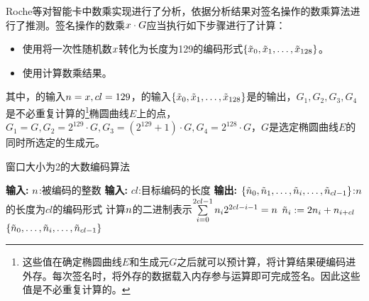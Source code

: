 {	Roche等\citep{Roche21}对智能卡中数乘实现进行了分析，依据分析结果对签名操作的数乘算法进行了推测。签名操作的数乘$x\cdot G$应当执行如下步骤进行了计算：
	
	\begin{itemize}
		\item 使用将一次性随机数$x$转化为长度为129的编码形式$\left\{\tilde{x}_0,\tilde{x}_1,\dots,\tilde{x}_{128}\right\}$。
		\item 使用计算数乘结果。
	\end{itemize}

	\noindent 其中，的输入$n=x,cl=129$，的输入$\left\{\tilde{x}_0,\tilde{x}_1,\dots,\tilde{x}_{128}\right\}$是的输出，$G_1,G_2,G_3,G_4$是不必重复计算的\footnote{这些值在确定椭圆曲线$E$和生成元$G$之后就可以预计算，将计算结果硬编码进外存。每次签名时，将外存的数据载入内存参与运算即可完成签名。因此这些值是不必重复计算的。}椭圆曲线$E$上的点，$G_1=G,G_2=2^{129}\cdot G,G_3=\left(2^{129}+1 \right) \cdot G,G_4=2^{128}\cdot G$，$G$是选定椭圆曲线$E$的同时所选定的生成元。
	
	\begin{breakablealgorithm}
		\caption{窗口大小为2的大数编码算法}\label{alg:encodek}
		\begin{algorithmic}[1]
			\Statex \textbf{输入:} $n$:被编码的整数
			\Statex \textbf{输入:} $cl$:目标编码的长度
			\Statex \textbf{输出:} $\left\{\tilde{n}_0,\tilde{n}_1,\dots,\tilde{n}_i,\dots, \tilde{n}_{cl-1}\right\}$:$n$的长度为$cl$的编码形式
			\State 计算$n$的二进制表示$\sum\limits_{i=0}^{2cl-1}n_i2^{2cl-i-1}=n$
			\State $\tilde {n}_i:=2n_i+n_{i+cl}$
			\EndFor
			\State \Return $\left\{\tilde{n}_0,\dots,\tilde{n}_i,\dots, \tilde{n}_{cl-1}\right\}$
		\end{algorithmic}
	\end{breakablealgorithm}

}
